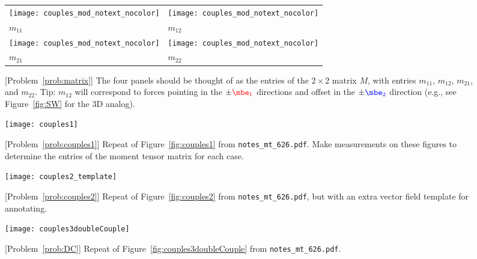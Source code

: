 \documentclass[11pt,titlepage,fleqn]{article}
\newcommand{\mtfile}{\texttt{notes\_mt\_626.pdf}}
\newcommand{\eone}{\textcolor{red}{\mbe_1}}
\newcommand{\etwo}{\textcolor{blue}{\mbe_2}}
\begin{document}
\begin{figure}
\centering
\begin{tabular}{|l|l|}
\hline
\texttt{[image: couples\_mod\_notext\_nocolor]} & 
\texttt{[image: couples\_mod\_notext\_nocolor]} \\
$m_{11}$ & $m_{12}$ \\ \hline
\texttt{[image: couples\_mod\_notext\_nocolor]} &
\texttt{[image: couples\_mod\_notext\_nocolor]} \\
$m_{21}$ & $m_{22}$ \\ \hline
\end{tabular}
\caption{
[Problem~\ref{prob:matrix}] 
The four panels should be thought of as the entries of the $2 \times 2$ matrix $M$, with entries $m_{11}$, $m_{12}$, $m_{21}$, and $m_{22}$.
Tip: $m_{12}$ will correspond to forces pointing in the $\pm\eone$ directions and offset in the $\pm\etwo$ direction (e.g., see Figure~\ref{fig:SW} for the 3D analog).
\label{fig:template4}
}
\end{figure}

\begin{figure}
\hspace{-1cm}
\texttt{[image: couples1]}
\caption{
[Problem~\ref{prob:couples1}] Repeat of Figure~\ref{fig:couples1} from \mtfile.
Make measurements on these figures to determine the entries of the moment tensor matrix for each case.
\label{fig:template_couples1}
}
\end{figure}

\begin{figure}
\hspace{-1cm}
\texttt{[image: couples2\_template]}
\caption{
[Problem~\ref{prob:couples2}] 
Repeat of Figure~\ref{fig:couples2} from \mtfile, but with an extra vector field template for annotating.
\label{fig:template_couples2}
}
\end{figure}

\begin{figure}
\hspace{-1cm}
\texttt{[image: couples3doubleCouple]}
\caption{
[Problem~\ref{prob:DC}] 
Repeat of Figure~\ref{fig:couples3doubleCouple} from \mtfile.
\label{fig:templateDC}
}
\end{figure}
\end{document}
